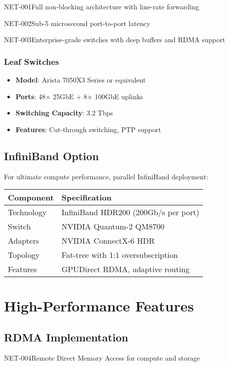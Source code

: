 \begin{requirement}{NET-001}{Full non-blocking architecture with line-rate forwarding}
\begin{requirement}{NET-002}{Sub-5 microsecond port-to-port latency}
\begin{requirement}{NET-003}{Enterprise-grade switches with deep buffers and RDMA support}
\subsubsection{Leaf Switches}
\begin{itemize}
    \item \textbf{Model}: Arista 7050X3 Series or equivalent
    \item \textbf{Ports}: 48× 25GbE + 8× 100GbE uplinks
    \item \textbf{Switching Capacity}: 3.2 Tbps
    \item \textbf{Features}: Cut-through switching, PTP support
\end{itemize}

\subsection{InfiniBand Option}

For ultimate compute performance, parallel InfiniBand deployment:

\begin{table}[H]
\centering
\begin{tabularx}{\textwidth}{@{}lX@{}}
\toprule
\textbf{Component} & \textbf{Specification} \\
\midrule
Technology & InfiniBand HDR200 (200Gb/s per port) \\
Switch & NVIDIA Quantum-2 QM8700 \\
Adapters & NVIDIA ConnectX-6 HDR \\
Topology & Fat-tree with 1:1 oversubscription \\
Features & GPUDirect RDMA, adaptive routing \\
\bottomrule
\end{tabularx}
\end{table}

\section{High-Performance Features}

\subsection{RDMA Implementation}

\begin{requirement}{NET-004}{Remote Direct Memory Access for compute and storage}

\begin{figure}[H]
\centering
{}
\end{figure}
\end{requirement}
\end{requirement}
\end{requirement}
\end{requirement}

